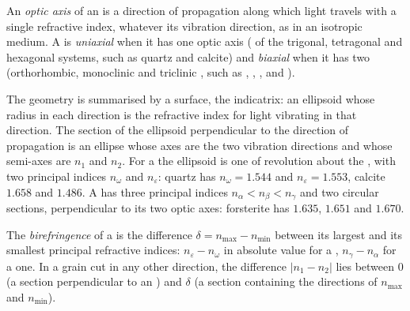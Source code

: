 \begin{definition}\label{def:b1:optical-mineralogy:optic-axis}
An \emph{optic axis} of an  is a
direction of propagation along which light travels with a single refractive
index, whatever its vibration direction, as in an isotropic medium. A 
is \emph{uniaxial} when it has one optic axis ( of the
trigonal, tetragonal and hexagonal systems, such as quartz and calcite) and
\emph{biaxial} when it has two (orthorhombic, monoclinic and
triclinic , such as , , ,  and
).
\end{definition}

The geometry is summarised by a surface, the indicatrix: an ellipsoid whose
radius in each direction is the refractive index for light vibrating in that
direction. The section of the ellipsoid perpendicular to the direction of
propagation is an ellipse whose axes are the two vibration directions and
whose semi-axes are $n_1$ and $n_2$. For a   the ellipsoid is
one of revolution about the , with two principal indices $n_\omega$
and $n_\varepsilon$: quartz has $n_\omega = 1.544$ and $n_\varepsilon = 1.553$,
calcite $1.658$ and $1.486$.
A   has three principal indices $n_\alpha < n_\beta < n_\gamma$
and two circular sections, perpendicular to its two optic axes: forsterite has
$1.635$, $1.651$ and $1.670$.

\begin{definition}\label{def:b1:optical-mineralogy:birefringence}
The \emph{birefringence} of a  is
the difference $\delta = n_{\max} - n_{\min}$ between its largest and its
smallest principal refractive indices: $n_\varepsilon - n_\omega$ in absolute
value for a  , $n_\gamma - n_\alpha$ for a  one. In a
grain cut in any other direction, the difference $|n_1 - n_2|$ lies between 0
(a section perpendicular to an ) and $\delta$ (a section containing
the directions of $n_{\max}$ and $n_{\min}$).
\end{definition}

